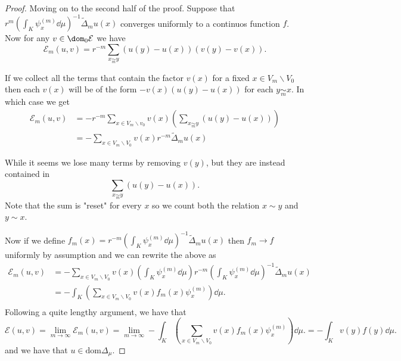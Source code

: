 \begin{proof}
	
	Moving on to the second half of the proof. Suppose that $r^{m} \left(\int_{K} \psi_x^{(m)} \dd \mu \right)^{-1} \widetilde{\Delta}_m u(x)$ converges uniformly to a continuos function $f$. Now for any $v \in \dom_0 \mathcal{E}$ we have 
	\begin{equation}
		\mathcal{E}_m(u,v) = r^{-m} \sum_{x \underset{m}{\sim} y} \left( u(y) - u(x) \right)\left(v(y) - v(x) \right).
	\end{equation}
	
	If we collect all the terms that contain the factor $v(x)$ for a fixed $x \in V_m \backslash V_0$ then each $v(x)$ will be of the form $-v(x) \left(u(y) - u(x) \right)$ for each $y \underset{m}{\sim} x$. In which case we get
	\begin{align}
		\mathcal{E}_m(u,v) &= - r^{-m}  \sum_{x \in V_m \backslash v_0} v(x) \left( \sum_{x \underset{m}{\sim} y} \left( u(y) - u(x) \right) \right) \\
		&= -\sum_{x \in V_m \backslash V_0} v(x) r^{-m} \widetilde{\Delta}_{m}u(x)
	\end{align}
	
	While it seems we lose many terms by removing $v(y)$, but they are instead contained in 
	$$\sum_{x \underset{m}{\sim} y} \left( u(y) - u(x) \right).$$ 
	Note that the sum is "reset" for every $x$ so we count both the relation $x \sim y$ and $y \sim x$.
	
	Now if we define $f_m(x) = r^{-m} \left(\int_{K} \psi_{x}^{(m)} \dd\mu \right)^{-1} \widetilde{\Delta}_{m}u(x)$ then $f_m \to f$ uniformly by assumption and we can rewrite the above as   
	\begin{align}
		\mathcal{E}_m(u,v) &= -\sum_{x \in V_m \backslash V_0} v(x) \left(\int_{K} \psi_{x}^{(m)} \dd\mu \right) r^{-m} \left(\int_{K} \psi_{x}^{(m)} \dd\mu \right)^{-1} \widetilde{\Delta}_{m}u(x) \\
		&= - \int_{K} \left( \sum_{x \in V_m \backslash V_0} v(x) f_m(x) \psi_x^{(m)}\right) \dd \mu. \\
	\end{align}
	Following a quite lengthy argument, we have that 
	\begin{equation}\label{theVeryLongOne}
		\mathcal{E}(u, v) = \lim_{m \to \infty} \mathcal{E}_m(u,v) = \lim_{m \to \infty}-\int_{K} \left( \sum_{x \in V_m \backslash V_0} v(x) f_m(x) \psi_x^{(m)}\right) \dd \mu. = - \int_{K} v(y)f(y) \dd \mu.
	\end{equation}
	and we have that $u \in \text{dom}\Delta_\mu$.
	

\end{proof}
